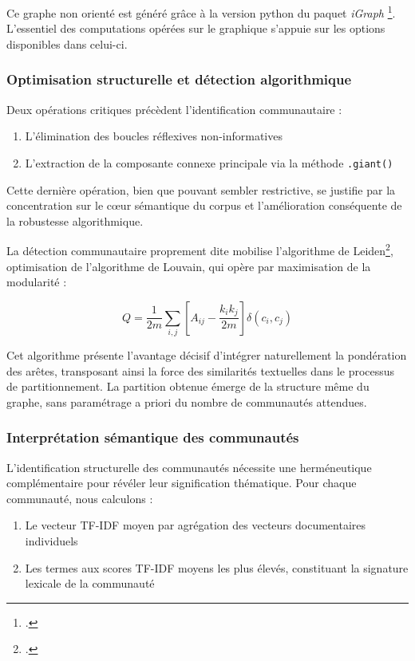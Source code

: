 \documentclass[12pt,a4paper,oneside,titlepage]{book} %
\begin{document}
Ce graphe non orienté est généré grâce à la version python du paquet \textit{iGraph} \footcite{Csardi_The_igraph_software_2006}. L'essentiel des computations opérées sur le graphique s'appuie sur les options disponibles dans celui-ci.

\subsubsection{Optimisation structurelle et détection algorithmique}

Deux opérations critiques précèdent l'identification communautaire :
\begin{enumerate}
    \item L'élimination des boucles réflexives non-informatives
    \item L'extraction de la composante connexe principale via la méthode \texttt{.giant()}
\end{enumerate}

Cette dernière opération, bien que pouvant sembler restrictive, se justifie par la concentration sur le cœur sémantique du corpus et l'amélioration conséquente de la robustesse algorithmique.

La détection communautaire proprement dite mobilise l'algorithme de Leiden\footcite{Traag2019}, optimisation de l'algorithme de Louvain, qui opère par maximisation de la modularité :

\begin{equation}
Q = \frac{1}{2m}\sum_{i,j} \left[ A_{ij} - \frac{k_i k_j}{2m} \right] \delta(c_i, c_j)
\end{equation}

Cet algorithme présente l'avantage décisif d'intégrer naturellement la pondération des arêtes, transposant ainsi la force des similarités textuelles dans le processus de partitionnement. La partition obtenue émerge de la structure même du graphe, sans paramétrage a priori du nombre de communautés attendues.

\subsubsection{Interprétation sémantique des communautés}

L'identification structurelle des communautés nécessite une herméneutique complémentaire pour révéler leur signification thématique. Pour chaque communauté, nous calculons :
\begin{enumerate}
    \item Le vecteur TF-IDF moyen par agrégation des vecteurs documentaires individuels
    \item Les termes aux scores TF-IDF moyens les plus élevés, constituant la signature lexicale de la communauté
\end{enumerate}
\end{document}

